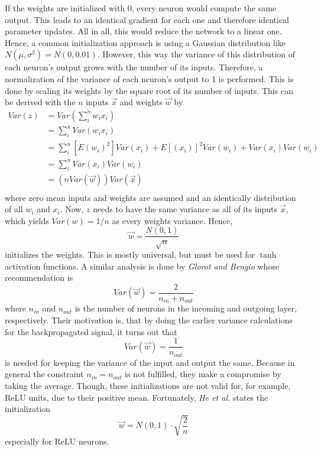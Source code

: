 If the weights are initialized with 0, every neuron would compute the same output.
This leads to an identical gradient for each one and therefore identical parameter updates.
All in all, this would reduce the network to a linear one.
Hence, a common initialization approach is using a Gaussian distribution like $N(\mu, \sigma^2) = N(0, 0.01)$.
However, this way the variance of this distribution of each neuron's output grows with the number of its inputs.
Therefore, a normalization of the variance of each neuron's output to 1 is performed.
This is done by scaling its weights by the square root of its number of inputs.
This can be derived with the $n$ inputs $\vec{x}$ and weights $\vec{w}$ by
\begin{align*}
	Var(z) &= Var \left( \sum_{i}^{n} w_i x_i \right) \\
	&= \sum_{i}^{n} Var \left( w_i x_i \right) \\
	&= \sum_{i}^{n} \left[ E(w_i)^2 \right] Var(x_i) + E \left[ (x_i) \right]^2 Var(w_i) + Var(x_i) Var(w_i) \\
	&= \sum_{i}^{n} Var(x_i) Var(w_i) \\
	&= (n Var(\vec{w})) Var(\vec{x}) \\
\end{align*}
where zero mean inputs and weights are assumed and an identically distribution of all $w_i$ and $x_i$.
Now, $z$ needs to have the same variance as all of its inputs $\vec{x}$, which yields $Var(w) = 1/n$ as every weights variance.
Hence,
\begin{equation}
	\vec{w} = \frac{N(0,1)}{\sqrt{n}}
\end{equation}
initializes the weights.
This is mostly universal, but must be used for $\tanh$ activation functions.
A similar analysis is done by \textit{Glorot and Bengio} \cite{Glorot10understandingthe} whose recommendation is
\begin{equation*}
	Var(\vec{w}) = \frac{2}{n_{in} + n_{out}}
\end{equation*}
where $n_{in}$ and $n_{out}$ is the number of neurons in the incoming and outgoing layer, respectively.
Their motivation is, that by doing the earlier variance calculations for the backpropagated signal, it turns out that
\begin{equation}
	Var(\vec{w}) = \frac{1}{n_{out}}
\end{equation}
is needed for keeping the variance of the input and output the same.
Because in general the constraint $n_{in} = n_{out}$ is not fulfilled, they make a compromise by taking the average.
Though, these initializations are not valid for, for example, ReLU units, due to their positive mean.
Fortunately, \textit{He et al.} \cite{DBLP:journals/corr/HeZR015} states the initialization
\begin{equation}
	\vec{w} = N(0,1) \cdot \sqrt{\frac{2}{n}}
\end{equation}
especially for ReLU neurons.